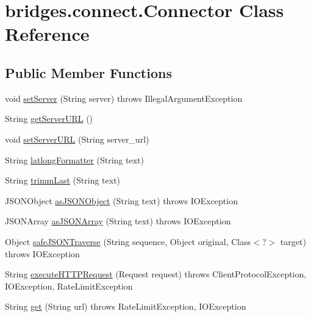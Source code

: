 \hypertarget{classbridges_1_1connect_1_1_connector}{}\section{bridges.\+connect.\+Connector Class Reference}
\label{classbridges_1_1connect_1_1_connector}
\subsection*{Public Member Functions}
\begin{DoxyCompactItemize}
\item 
void \hyperlink{classbridges_1_1connect_1_1_connector_acab24a8c4ffd3349ec67536552fb30b3}{set\+Server} (String server)  throws Illegal\+Argument\+Exception 
\item 
String \hyperlink{classbridges_1_1connect_1_1_connector_a0b9809180aac96a83e31e224ab5ed6ec}{get\+Server\+U\+R\+L} ()
\item 
void \hyperlink{classbridges_1_1connect_1_1_connector_a71f449c91e529f79730df27e01fdf674}{set\+Server\+U\+R\+L} (String server\+\_\+url)
\item 
String \hyperlink{classbridges_1_1connect_1_1_connector_a2318cd93d18ef58285598f6f9cdf727b}{latlong\+Formatter} (String text)
\item 
String \hyperlink{classbridges_1_1connect_1_1_connector_ac0dca0bd99b6abbbd8a77874a95e6d49}{trimm\+Last} (String text)
\item 
J\+S\+O\+N\+Object \hyperlink{classbridges_1_1connect_1_1_connector_aac3fb75dd7975c4439cfd1bf6cefe0a6}{as\+J\+S\+O\+N\+Object} (String text)  throws I\+O\+Exception 
\item 
J\+S\+O\+N\+Array \hyperlink{classbridges_1_1connect_1_1_connector_aa5bd647713545fa24c6d730eacb6bc54}{as\+J\+S\+O\+N\+Array} (String text)  throws I\+O\+Exception 
\item 
Object \hyperlink{classbridges_1_1connect_1_1_connector_ab7d1d242fbf9acade316650e54a3d020}{safe\+J\+S\+O\+N\+Traverse} (String sequence, Object original, Class$<$?$>$ target)  throws I\+O\+Exception 
\item 
String \hyperlink{classbridges_1_1connect_1_1_connector_aabcfde23d155c8c42edb8a1407320bc5}{execute\+H\+T\+T\+P\+Request} (Request request)  throws Client\+Protocol\+Exception, I\+O\+Exception, Rate\+Limit\+Exception 
\item 
String \hyperlink{classbridges_1_1connect_1_1_connector_aec8d54bf707c50d6f8173a0c1640fcd5}{get} (String url)  throws Rate\+Limit\+Exception, I\+O\+Exception 

\end{DoxyCompactItemize}
